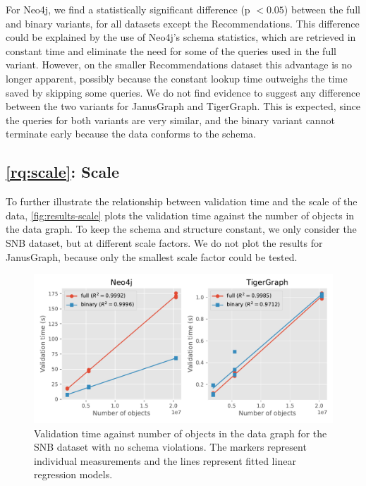 \documentclass{report}
\theoremstyle{definition}
\begin{document}
For Neo4j, we find a statistically significant difference (p $< 0.05$) between the full and binary variants, for all datasets except the Recommendations. This difference could be explained by the use of Neo4j's schema statistics, which are retrieved in constant time and eliminate the need for some of the queries used in the full variant. However, on the smaller Recommendations dataset this advantage is no longer apparent, possibly because the constant lookup time outweighs the time saved by skipping some queries. We do not find evidence to suggest any difference between the two variants for JanusGraph and TigerGraph. This is expected, since the queries for both variants are very similar, and the binary variant cannot terminate early because the data conforms to the schema.

\subsection{\ref*{rq:scale}: Scale}

To further illustrate the relationship between validation time and the scale of the data, \autoref{fig:results-scale} plots the validation time against the number of objects in the data graph. To keep the schema and structure constant, we only consider the SNB dataset, but at different scale factors. We do not plot the results for JanusGraph, because only the smallest scale factor could be tested.

\begin{figure}[t]
  \centering
  \includegraphics[scale=0.5]{figures/results-scale.pdf}
  \caption[Validation time against number of objects in the data graph]{Validation time against number of objects in the data graph for the SNB dataset with no schema violations. The markers represent individual measurements and the lines represent fitted linear regression models.}
  \label{fig:results-scale}
\end{figure}
\end{document}
